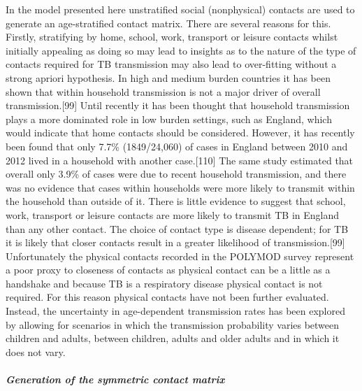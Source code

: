 \documentclass[11pt,twoside]{bristolthesis}
\begin{document}
  In the model presented here unstratified social (nonphysical) contacts are used to generate an age-stratified contact matrix. There are several reasons for this. Firstly, stratifying by home, school, work, transport or leisure contacts whilst initially appealing as doing so may lead to insights as to the nature of the type of contacts required for TB transmission may also lead to over-fitting without a strong apriori hypothesis. In high and medium burden countries it has been shown that within household transmission is not a major driver of overall transmission.{[}99{]} Until recently it has been thought that household transmission plays a more dominated role in low burden settings, such as England, which would indicate that home contacts should be considered. However, it has recently been found that only 7.7\% (1849/24,060) of cases in England between 2010 and 2012 lived in a household with another case.{[}110{]} The same study estimated that overall only 3.9\% of cases were due to recent household transmission, and there was no evidence that cases within households were more likely to transmit within the household than outside of it. There is little evidence to suggest that school, work, transport or leisure contacts are more likely to transmit TB in England than any other contact. The choice of contact type is disease dependent; for TB it is likely that closer contacts result in a greater likelihood of transmission.{[}99{]} Unfortunately the physical contacts recorded in the POLYMOD survey represent a poor proxy to closeness of contacts as physical contact can be a little as a handshake and because TB is a respiratory disease physical contact is not required. For this reason physical contacts have not been further evaluated. Instead, the uncertainty in age-dependent transmission rates has been explored by allowing for scenarios in which the transmission probability varies between children and adults, between children, adults and older adults and in which it does not vary.
  
  \hypertarget{generation-of-the-symmetric-contact-matrix}{%
  \subparagraph{Generation of the symmetric contact matrix}\label{generation-of-the-symmetric-contact-matrix}}
  
\end{document}
